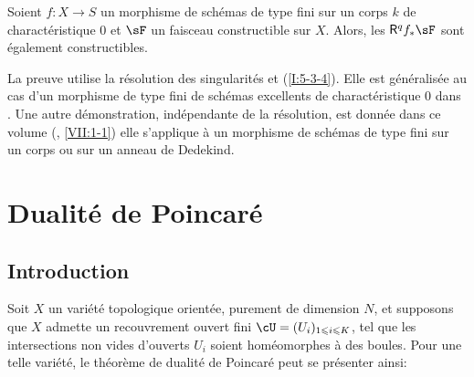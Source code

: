 \begin{theorem}\label{I:5-3-7} %
Soient $f:X\to S$ un morphisme de schémas de type fini sur un corps $k$ de 
charactéristique $0$ et $\sF$ un faisceau constructible sur $X$. Alors, les 
$\R^q f_* \sF$ sont également constructibles.
\end{theorem}

La preuve utilise la résolution des singularités et (\ref{I:5-3-4}). Elle est 
généralisée au cas d'un morphisme de type fini de schémas excellents de 
charactéristique $0$ dans \cite[XIX.5]{sga4}. Une autre démonstration, 
indépendante de la résolution, est donnée dans ce volume 
(, \ref{VII:1-1}) 
elle s'applique à un morphisme de schémas de type fini sur un corps ou sur 
un anneau de Dedekind. 




















\section{Dualité de Poincaré}










\subsection{Introduction}\label{I:6-1}

Soit $X$ un variété topologique orientée, purement de dimension $N$, et 
supposons que $X$ admette un recouvrement ouvert fini 
$\cU=(U_i)_{1\leqslant i\leqslant K}$, tel que les intersections non vides 
d'ouverts $U_i$ soient homéomorphes à des boules. Pour une telle variété, 
le théorème de dualité de Poincaré peut se présenter ainsi: 

